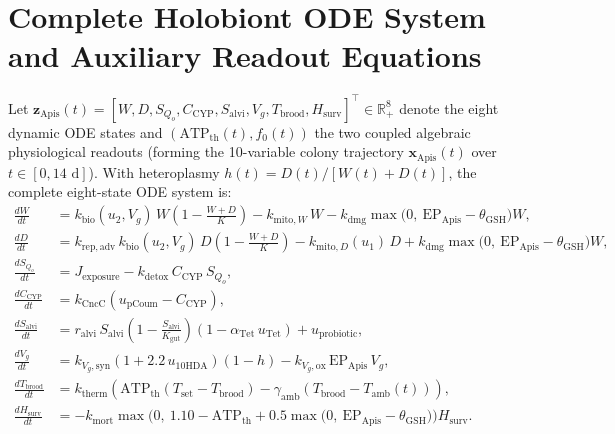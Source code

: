\documentclass[11pt]{article}
\begin{document}
\appendix
\section{Complete Holobiont ODE System and Auxiliary Readout Equations}
\label{app:apis_math}
\setcounter{equation}{0}

Let $\mathbf{z}_{\mathrm{Apis}}(t) = [W, D, S_{Q_o}, C_{\mathrm{CYP}}, S_{\mathrm{alvi}}, V_g, T_{\mathrm{brood}}, H_{\mathrm{surv}}]^\top \in \mathbb{R}_+^8$ denote the eight dynamic ODE states and $(\mathrm{ATP}_{\mathrm{th}}(t), f_0(t))$ the two coupled algebraic physiological readouts (forming the 10-variable colony trajectory $\mathbf{x}_{\mathrm{Apis}}(t)$ over $t \in [0, 14\text{ d}]$). With heteroplasmy $h(t) = D(t) / [W(t) + D(t)]$, the complete eight-state ODE system is:
\begin{align}
  \frac{dW}{dt} &= k_{\mathrm{bio}}(u_2, V_g)\,W\left(1 - \frac{W+D}{K}\right) - k_{\mathrm{mito},W}\,W - k_{\mathrm{dmg}}\max\!\big(0,\ \mathrm{EP}_{\mathrm{Apis}} - \theta_{\mathrm{GSH}}\big)W, \label{eq:app_W}\\
  \frac{dD}{dt} &= k_{\mathrm{rep,adv}}\,k_{\mathrm{bio}}(u_2, V_g)\,D\left(1 - \frac{W+D}{K}\right) - k_{\mathrm{mito},D}(u_1)\,D + k_{\mathrm{dmg}}\max\!\big(0,\ \mathrm{EP}_{\mathrm{Apis}} - \theta_{\mathrm{GSH}}\big)W, \label{eq:app_D}\\
  \frac{dS_{Q_o}}{dt} &= J_{\mathrm{exposure}} - k_{\mathrm{detox}}\,C_{\mathrm{CYP}}\,S_{Q_o}, \label{eq:app_SQo}\\
  \frac{dC_{\mathrm{CYP}}}{dt} &= k_{\mathrm{CncC}}\left(u_{\mathrm{pCoum}} - C_{\mathrm{CYP}}\right), \label{eq:app_CYP}\\
  \frac{dS_{\mathrm{alvi}}}{dt} &= r_{\mathrm{alvi}}\,S_{\mathrm{alvi}}\left(1 - \frac{S_{\mathrm{alvi}}}{K_{\mathrm{gut}}}\right)\left(1 - \alpha_{\mathrm{Tet}}\,u_{\mathrm{Tet}}\right) + u_{\mathrm{probiotic}}, \label{eq:app_Salvi}\\
  \frac{dV_g}{dt} &= k_{V_g,\mathrm{syn}}\left(1 + 2.2\,u_{\mathrm{10HDA}}\right)(1 - h) - k_{V_g,\mathrm{ox}}\,\mathrm{EP}_{\mathrm{Apis}}\,V_g, \label{eq:app_Vg}\\
  \frac{dT_{\mathrm{brood}}}{dt} &= k_{\mathrm{therm}}\left(\mathrm{ATP}_{\mathrm{th}}\left(T_{\mathrm{set}} - T_{\mathrm{brood}}\right) - \gamma_{\mathrm{amb}}\left(T_{\mathrm{brood}} - T_{\mathrm{amb}}(t)\right)\right), \label{eq:app_Tbrood}\\
  \frac{dH_{\mathrm{surv}}}{dt} &= -k_{\mathrm{mort}}\max\!\Big(0,\ 1.10 - \mathrm{ATP}_{\mathrm{th}} + 0.5\max\!\big(0,\ \mathrm{EP}_{\mathrm{Apis}} - \theta_{\mathrm{GSH}}\big)\Big)H_{\mathrm{surv}}. \label{eq:app_Hsurv}
\end{align}
\end{document}
